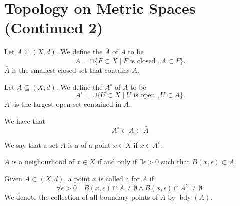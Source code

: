 \documentclass[notoc,notitlepage]{tufte-book}
\DeclareMathOperator{\bdy}{bdy }
\begin{document}
\section{Topology on Metric Spaces (Continued 2)}%
\label{sec:topology_on_metric_spaces_continued_2}

\begin{defn}[Closure]\label{defn:closure}
  Let $A \subseteq (X, d)$. We define the  $\bar{A}$ of $A$ to be
  \begin{equation*}
    \bar{A} = \cap \{ F \subset X \mid F \text{ is closed }, A \subset F \}.
  \end{equation*}
  $\bar{A}$ is the smallest closed set that contains $A$.
\end{defn}

\begin{defn}[Interior]\label{defn:interior}
  Let $A \subseteq (X, d)$. We define the  $A^\circ$ of $A$ to be
  \begin{equation*}
    A^\circ = \cup \{ U \subset X \mid U \text{ is open }, U \subset A \}.
  \end{equation*}
  $A^\circ$ is the largest open set contained in $A$.
\end{defn}

\begin{remark}
  We have that
  \begin{equation*}
    A^\circ \subset A \subset \bar{A}
  \end{equation*}
\end{remark}

\begin{defn}[Neighbourhood]\label{defn:neighbourhood}
  We say that a set $A$ is a  of a point $x \in X$ if $x \in A^\circ$.
\end{defn}

\begin{note}
  $A$ is a neighourhood of $x \in X$ if and only if $\exists \epsilon > 0$ such that $B(x, \epsilon) \subset A$.
\end{note}

\begin{defn}\label{defn:boundary_point}
  Given $A \subset (X, d)$, a point $x$ is called a  for $A$ if
  \begin{equation*}
    \forall \epsilon > 0 \quad B(x, \epsilon) \cap A \neq \emptyset \land B(x, \epsilon) \cap A^C \neq \emptyset.
  \end{equation*}
  We denote the collection of all boundary points of $A$ by $\bdy(A)$.
\end{defn}
\end{document}
